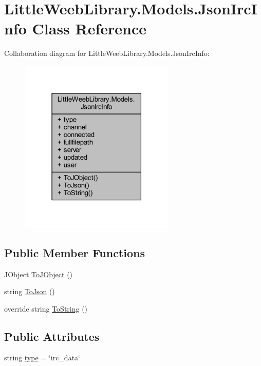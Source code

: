 \hypertarget{class_little_weeb_library_1_1_models_1_1_json_irc_info}{}\section{Little\+Weeb\+Library.\+Models.\+Json\+Irc\+Info Class Reference}
\label{class_little_weeb_library_1_1_models_1_1_json_irc_info}


Collaboration diagram for Little\+Weeb\+Library.\+Models.\+Json\+Irc\+Info\+:\nopagebreak
\begin{figure}[H]
\begin{center}
\leavevmode
\includegraphics[width=210pt]{class_little_weeb_library_1_1_models_1_1_json_irc_info__coll__graph}
\end{center}
\end{figure}
\subsection*{Public Member Functions}
\begin{DoxyCompactItemize}
\item 
J\+Object \mbox{\hyperlink{class_little_weeb_library_1_1_models_1_1_json_irc_info_a477f060b125dfcc0464e41d0dca94acf}{To\+J\+Object}} ()
\item 
string \mbox{\hyperlink{class_little_weeb_library_1_1_models_1_1_json_irc_info_af7d4dd885c7289ca28b0147d4feb2b84}{To\+Json}} ()
\item 
override string \mbox{\hyperlink{class_little_weeb_library_1_1_models_1_1_json_irc_info_a7a9635e9efc6d62801ec57bdb90c1cee}{To\+String}} ()
\end{DoxyCompactItemize}
\subsection*{Public Attributes}
\begin{DoxyCompactItemize}
\item 
string \mbox{\hyperlink{class_little_weeb_library_1_1_models_1_1_json_irc_info_afe4b739c9c9d3e79e56197dadb88a16a}{type}} = \char`\"{}irc\+\_\+data\char`\"{}
\end{DoxyCompactItemize}
